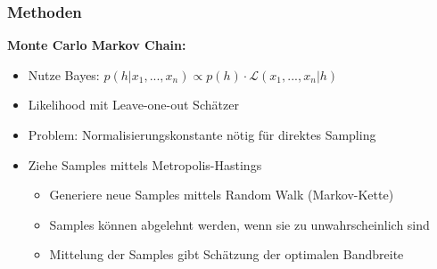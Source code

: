 \begin{frame}
	\frametitle{Methoden}
		
	\textbf{Monte Carlo Markov Chain:}
	\begin{itemize}
		\item Nutze Bayes: $p(h | x_1,...,x_n) \propto p(h) \cdot \mathcal{L}(x_1,...,x_n | h)$
		\item Likelihood mit Leave-one-out Sch\"atzer
		\item Problem: Normalisierungskonstante n\"otig f\"ur direktes Sampling
		\item Ziehe Samples mittels Metropolis-Hastings
		\begin{itemize}
			\item Generiere neue Samples mittels Random Walk (Markov-Kette)
			\item Samples k\"onnen abgelehnt werden, wenn sie zu unwahrscheinlich sind
			\item Mittelung der Samples gibt Sch\"atzung der optimalen Bandbreite
		\end{itemize}
	\end{itemize}
\end{frame}